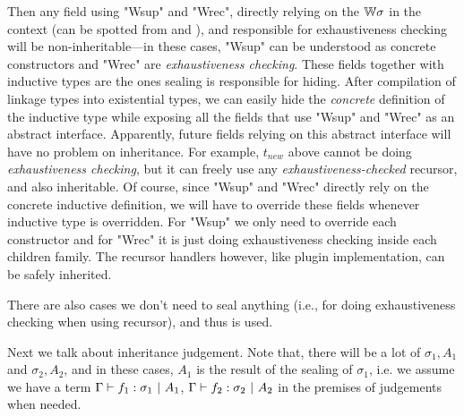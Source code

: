 Then any field using "Wsup" and "Wrec", directly relying on the
${\mathbb{W}}\sigma$ in the context (can be spotted from  and
), and responsible for exhaustiveness checking will be non-inheritable---in these cases, "Wsup"
can be understood as concrete constructors and "Wrec" are
\textit{exhaustiveness checking}. These fields together with inductive
types are the ones sealing is responsible for hiding.
After compilation
of linkage types into existential types, we can easily hide the
\textit{concrete} definition of the inductive type while exposing all
the fields that use "Wsup" and "Wrec" as an abstract interface.
Apparently, future fields relying on this abstract interface will have no
problem on inheritance. 
For example, $t_{new}$ above cannot be doing \textit{exhaustiveness
checking}, but it can freely use any \textit{exhaustiveness-checked}
recursor, and also inheritable.
Of course, since "Wsup" and "Wrec" directly rely on the concrete inductive definition, we will have to override these fields whenever inductive type is overridden. For "Wsup" we only need to override each constructor and for "Wrec" it is just doing exhaustiveness checking inside each children family. The recursor handlers however, like plugin implementation, can be safely inherited.

There are also cases we don't need to seal anything (i.e., for doing
exhaustiveness checking when using recursor), and thus  is
used. 





Next we talk about inheritance judgement. Note that, there will be a lot of $\sigma_1, A_1$ and $\sigma_2, A_2$, and in these cases, $A_1$ is the result of the sealing of $\sigma_1$, i.e. we assume we have a term ${ {\Gamma} \vdash {f_1} : {\sigma_1} \ |\ {A_1} }$, ${ {\Gamma} \vdash {f_2} : {\sigma_2} \ |\ {A_2} }$ in the premises of judgements when needed.


